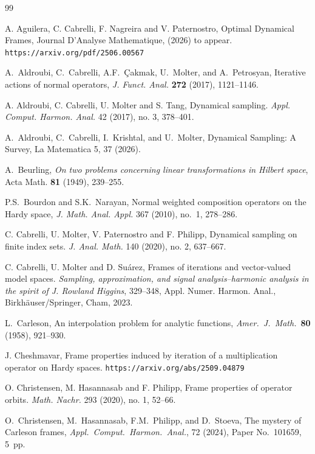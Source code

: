 \documentclass[11pt]{amsart}
\theoremstyle{definition}
\theoremstyle{remark}
\numberwithin{equation}{section}
\begin{document}
\begin{thebibliography}{99}



A. Aguilera, C. Cabrelli, F. Nagreira and V. Paternostro,
Optimal Dynamical Frames, Journal D'Analyse Mathematique, (2026) to appear.
{\tt https://arxiv.org/pdf/2506.00567}

A.~Aldroubi, C.~Cabrelli, A.F.~{\c{C}}akmak, U.~Molter, and A.~Petrosyan,
Iterative actions of normal operators,
\emph{J. Funct. Anal.} \textbf{272} (2017), 1121--1146.


A. Aldroubi, C. Cabrelli, U. Molter and S. Tang, Dynamical sampling.
{\em Appl. Comput. Harmon. Anal.} 42 (2017), no. 3, 378--401.


A.~Aldroubi, C.~Cabrelli, I.~Krishtal, and U.~Molter,
Dynamical Sampling: A Survey, La Matematica 5, 37 (2026).


A.~Beurling,
\emph{On two problems concerning linear transformations in Hilbert space},
Acta Math. \textbf{81} (1949), 239--255.


P.S.~Bourdon and S.K.~Narayan,
Normal weighted composition operators on the Hardy space,
{\em J. Math. Anal. Appl.}  367  (2010), no.~1, 278--286.

C. Cabrelli, U. Molter, V. Paternostro and F. Philipp, Dynamical sampling on finite index sets.
{\em J. Anal. Math.} 140 (2020), no. 2, 637--667.

C. Cabrelli, U. Molter and D. Su\'arez,   Frames of iterations and vector-valued model spaces.
{\em Sampling, approximation, and signal analysis--harmonic analysis in the spirit of J. Rowland Higgins}, 329--348, Appl. Numer. Harmon. Anal., Birkh{\"a}user/Springer, Cham, 2023.

L.~Carleson,
An interpolation problem for analytic functions,
{\em Amer.\ J.\ Math.}\ \textbf{80} (1958), 921--930.


J. Cheshmavar, Frame properties induced by iteration of a multiplication operator on Hardy spaces.
{\tt https://arxiv.org/abs/2509.04879}

O. Christensen, M. Hasannasab and F. Philipp,   Frame properties of operator orbits.
{\em Math. Nachr.} 293 (2020), no. 1, 52--66.

O.~Christensen, M.~Hasannasab, F.M.~Philipp, and D.~Stoeva,
\newblock The mystery of Carleson frames,
\newblock \emph{Appl.\ Comput.\ Harmon.\ Anal.}, 72 (2024), Paper No.\ 101659, 5~pp.






\end{thebibliography}
\end{document}
